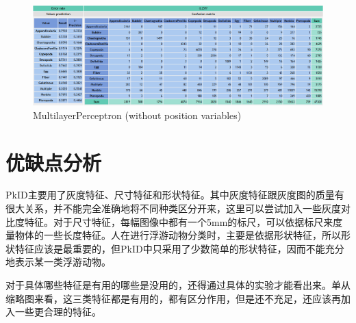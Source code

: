\documentclass[12pt]{article}
\begin{document}
\begin{figure}[!ht]
\centering
\includegraphics[width=1.0\textwidth]{MultilayerPerceptron.png}
\caption{MultilayerPerceptron (without position variables)}
\label{fig: MultilayerPerceptron}
\end{figure} 

\section{优缺点分析}

PkID主要用了灰度特征、尺寸特征和形状特征。其中灰度特征跟灰度图的质量有很大关系，并不能完全准确地将不同种类区分开来，这里可以尝试加入一些灰度对比度特征。对于尺寸特征，每幅图像中都有一个5mm的标尺，可以依据标尺来度量物体的一些长度特征。人在进行浮游动物分类时，主要是依据形状特征，所以形状特征应该是最重要的，但PkID中只采用了少数简单的形状特征，因而不能充分地表示某一类浮游动物。

对于具体哪些特征是有用的哪些是没用的，还得通过具体的实验才能看出来。单从缩略图来看，这三类特征都是有用的，都有区分作用，但是还不充足，还应该再加入一些更合理的特征。











%


\end{document}
